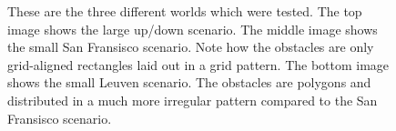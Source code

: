 \begin{figure}
	\centering


        
    \caption{These are the three different worlds which were tested. The top image shows the large up/down scenario. The middle image shows the small San Fransisco scenario. Note how the obstacles are only grid-aligned rectangles laid out in a grid pattern. The bottom image shows the small Leuven scenario. The obstacles are polygons and distributed in a much more irregular pattern compared to the San Fransisco scenario.}\label{fig:scenarios}
\end{figure}


